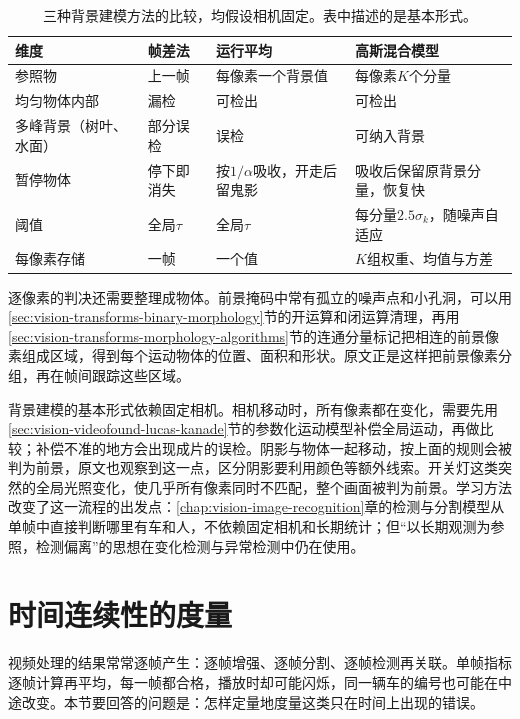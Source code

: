\begin{table}[htbp]
  \centering
  \small
  \begin{tabularx}{\linewidth}{@{}lXXX@{}}
    \toprule
    维度 & 帧差法 & 运行平均 & 高斯混合模型\\
    \midrule
    参照物 & 上一帧 & 每像素一个背景值 & 每像素$K$个分量\\
    均匀物体内部 & 漏检 & 可检出 & 可检出\\
    多峰背景（树叶、水面） & 部分误检 & 误检 & 可纳入背景\\
    暂停物体 & 停下即消失 & 按$1/\alpha$吸收，开走后留鬼影 & 吸收后保留原背景分量，恢复快\\
    阈值 & 全局$\tau$ & 全局$\tau$ & 每分量$2.5\sigma_k$，随噪声自适应\\
    每像素存储 & 一帧 & 一个值 & $K$组权重、均值与方差\\
    \bottomrule
  \end{tabularx}
  \caption{三种背景建模方法的比较，均假设相机固定。表中描述的是基本形式。}
  \label{tab:vision-videofound-background-compare}
\end{table}

逐像素的判决还需要整理成物体。前景掩码中常有孤立的噪声点和小孔洞，可以用\ref{sec:vision-transforms-binary-morphology}节的开运算和闭运算清理，再用\ref{sec:vision-transforms-morphology-algorithms}节的连通分量标记把相连的前景像素组成区域，得到每个运动物体的位置、面积和形状。原文正是这样把前景像素分组，再在帧间跟踪这些区域。

背景建模的基本形式依赖固定相机。相机移动时，所有像素都在变化，需要先用\ref{sec:vision-videofound-lucas-kanade}节的参数化运动模型补偿全局运动，再做比较；补偿不准的地方会出现成片的误检。阴影与物体一起移动，按上面的规则会被判为前景，原文也观察到这一点，区分阴影要利用颜色等额外线索。开关灯这类突然的全局光照变化，使几乎所有像素同时不匹配，整个画面被判为前景。学习方法改变了这一流程的出发点：\ref{chap:vision-image-recognition}章的检测与分割模型从单帧中直接判断哪里有车和人，不依赖固定相机和长期统计；但“以长期观测为参照，检测偏离”的思想在变化检测与异常检测中仍在使用。

\section{时间连续性的度量}
\label{sec:vision-videofound-consistency}

视频处理的结果常常逐帧产生：逐帧增强、逐帧分割、逐帧检测再关联。单帧指标逐帧计算再平均，每一帧都合格，播放时却可能闪烁，同一辆车的编号也可能在中途改变。本节要回答的问题是：怎样定量地度量这类只在时间上出现的错误。

